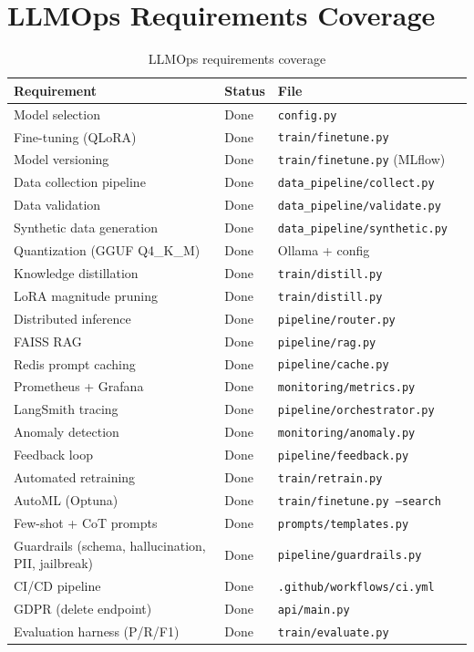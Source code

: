 \documentclass[12pt,a4paper]{article}
\begin{document}
\section{LLMOps Requirements Coverage}

\begin{table}[H]
\centering
\small
\begin{tabular}{llll}
\toprule
\textbf{Requirement} & \textbf{Status} & \textbf{File} \\
\midrule
Model selection & Done & \texttt{config.py} \\
Fine-tuning (QLoRA) & Done & \texttt{train/finetune.py} \\
Model versioning & Done & \texttt{train/finetune.py} (MLflow) \\
Data collection pipeline & Done & \texttt{data\_pipeline/collect.py} \\
Data validation & Done & \texttt{data\_pipeline/validate.py} \\
Synthetic data generation & Done & \texttt{data\_pipeline/synthetic.py} \\
Quantization (GGUF Q4\_K\_M) & Done & Ollama + config \\
Knowledge distillation & Done & \texttt{train/distill.py} \\
LoRA magnitude pruning & Done & \texttt{train/distill.py} \\
Distributed inference & Done & \texttt{pipeline/router.py} \\
FAISS RAG & Done & \texttt{pipeline/rag.py} \\
Redis prompt caching & Done & \texttt{pipeline/cache.py} \\
Prometheus + Grafana & Done & \texttt{monitoring/metrics.py} \\
LangSmith tracing & Done & \texttt{pipeline/orchestrator.py} \\
Anomaly detection & Done & \texttt{monitoring/anomaly.py} \\
Feedback loop & Done & \texttt{pipeline/feedback.py} \\
Automated retraining & Done & \texttt{train/retrain.py} \\
AutoML (Optuna) & Done & \texttt{train/finetune.py --search} \\
Few-shot + CoT prompts & Done & \texttt{prompts/templates.py} \\
Guardrails (schema, hallucination, PII, jailbreak) & Done & \texttt{pipeline/guardrails.py} \\
CI/CD pipeline & Done & \texttt{.github/workflows/ci.yml} \\
GDPR (delete endpoint) & Done & \texttt{api/main.py} \\
Evaluation harness (P/R/F1) & Done & \texttt{train/evaluate.py} \\
\bottomrule
\end{tabular}
\caption{LLMOps requirements coverage}
\end{table}
\end{document}
